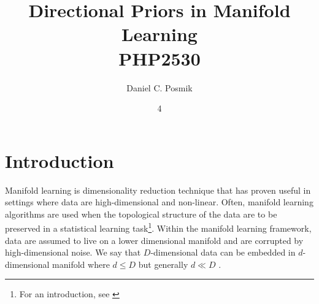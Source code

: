 \documentclass[twoside,11pt]{article}
\begin{document}
\title{	Directional Priors in Manifold Learning \\
\vspace{.1in}
PHP2530			
}

\author{ Daniel C. Posmik }

\maketitle
\date{4 }

\section{Introduction} \label{sc:intro}

Manifold learning is dimensionality reduction technique that has proven useful in settings where data are high-dimensional and non-linear. Often, manifold learning algorithms are used when the topological structure of the data are to be preserved in a statistical learning task\footnote{For an introduction, see \citet{Meila2023}}. Within the manifold learning framework, data are assumed to live on a lower dimensional manifold and are corrupted by high-dimensional noise. We say that $D$-dimensional data can be embedded in $d$-dimensional manifold where $d \leq D$ but generally $d \ll D$ .  
\end{document}
